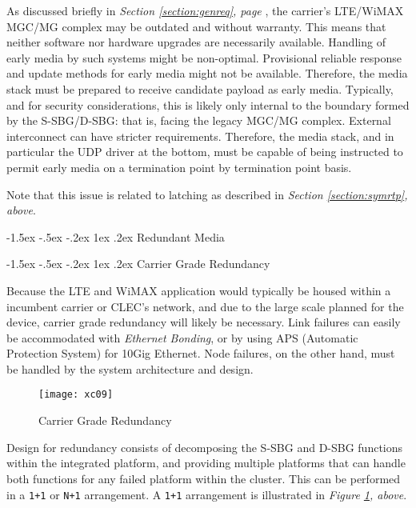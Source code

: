 \documentclass[letterpaper,final,notitlepage,twocolumn,10pt,twoside]{article}
\makeatletter
\let\normalsize = \small
\let\small = \footnotesize
\let\footnotesize = \scriptsize
\let\scriptsize = \tiny
\renewcommand\subsection{\@startsection{subsection}{2}{\z@}%
                                     {-1.5ex \@plus -.5ex \@minus -.2ex}%
                                     {1ex \@plus .2ex}%
                                     {\normalfont\normalsize\bfseries}}
\makeatother
\begin{document}
As discussed briefly in {\sl Section \ref{section:genreq}, page
\pageref{section:genreq}}, the carrier's LTE/WiMAX MGC/MG complex may be
outdated and without warranty.  This means that neither software nor hardware
upgrades are necessarily available.  Handling of early media by such systems
might be non-optimal.  Provisional reliable response and update methods for
early media might not be available.  Therefore, the media stack must be
prepared to receive candidate payload as early media.  Typically, and for
security considerations, this is likely only internal to the boundary formed
by the S-SBG/D-SBG: that is, facing the legacy MGC/MG complex.  External
interconnect can have stricter requirements.  Therefore, the media stack, and
in particular the UDP driver at the bottom, must be capable of being
instructed to permit early media on a termination point by termination point
basis.

Note that this issue is related to latching as described in {\sl Section
\ref{section:symrtp}, above}.

\subsection{Redundant Media}
\label{section:redmed}

\subsection{Carrier Grade Redundancy}
\label{section:grade}

Because the LTE and WiMAX application would typically be housed within a
incumbent carrier or CLEC's network, and due to the large scale planned for the
device, carrier grade redundancy will likely be necessary.  Link failures can
easily be accommodated with {\it Ethernet Bonding}, or by using APS (Automatic
Protection System) for 10Gig Ethernet.  Node failures, on the other hand, must
be handled by the system architecture and design.

\begin{figure}[htp]
\center\texttt{[image: xc09]}
\caption{Carrier Grade Redundancy}
\label{figure:xc09}
\end{figure}

Design for redundancy consists of decomposing the S-SBG and D-SBG functions
within the integrated platform, and providing multiple platforms that can handle
both functions for any failed platform within the cluster.  This can be
performed in a {\tt 1+1} or {\tt N+1} arrangement.  A {\tt 1+1} arrangement is
illustrated in {\sl Figure \ref{figure:xc09}, above}.
\end{document}
